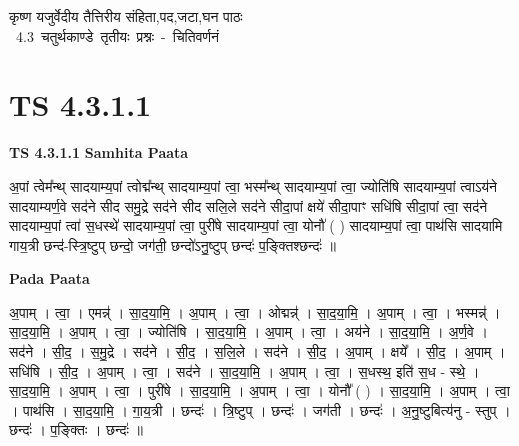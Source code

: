 \documentclass[17pt]{extarticle}
\begin{document}
\begin{titlepage}
    \begin{center}
 
\begin{sanskrit}
    { \Huge
    कृष्ण यजुर्वेदीय तैत्तिरीय संहिता,पद,जटा,घन पाठः 
    }
    \\
    \vspace{2.5cm}
    \mbox{ \Huge
    4.3      चतुर्थकाण्डे तृतीयः प्रश्नः - चितिवर्णनं   }
\end{sanskrit}
\end{center}

\end{titlepage}
\tableofcontents
\pagebreak

\section*{ TS 4.3.1.1 }

\textbf{TS 4.3.1.1 } \newline
\textbf{Samhita Paata} \newline

अ॒पां त्वेम᳚न्थ् सादयाम्य॒पां त्वोद्म᳚न्थ् सादयाम्य॒पां त्वा॒ भस्म᳚न्थ् सादयाम्य॒पां त्वा॒ ज्योति॑षि सादयाम्य॒पां त्वाऽय॑ने सादयाम्यर्ण॒वे सद॑ने सीद समु॒द्रे सद॑ने सीद सलि॒ले सद॑ने सीदा॒पां क्षये॑ सीदा॒पाꣳ सधि॑षि सीदा॒पां त्वा॒ सद॑ने सादयाम्य॒पां त्वा॑ स॒धस्थे॑ सादयाम्य॒पां त्वा॒ पुरी॑षे सादयाम्य॒पां त्वा॒ योनौ॑ ( ) सादयाम्य॒पां त्वा॒ पाथ॑सि सादयामि गाय॒त्री छन्द॑-स्त्रि॒ष्टुप् छन्दो॒ जग॑ती॒ छन्दो॑ऽनु॒ष्टुप् छन्दः॑ प॒ङ्क्तिश्छन्दः॑ ॥ \newline

\textbf{Pada Paata} \newline

अ॒पाम् । त्वा॒ । एमन्न्॑ । सा॒द॒या॒मि॒ । अ॒पाम् । त्वा॒ । ओद्मन्न्॑ । सा॒द॒या॒मि॒ । अ॒पाम् । त्वा॒ । भस्मन्न्॑ । सा॒द॒या॒मि॒ । अ॒पाम् । त्वा॒ । ज्योति॑षि । सा॒द॒या॒मि॒ । अ॒पाम् । त्वा॒ । अय॑ने । सा॒द॒या॒मि॒ । अ॒र्ण॒वे । सद॑ने । सी॒द॒ । स॒मु॒द्रे । सद॑ने । सी॒द॒ । स॒लि॒ले । सद॑ने । सी॒द॒ । अ॒पाम् । क्षये᳚ । सी॒द॒ । अ॒पाम् । सधि॑षि । सी॒द॒ । अ॒पाम् । त्वा॒ । सद॑ने । सा॒द॒या॒मि॒ । अ॒पाम् । त्वा॒ । स॒धस्थ॒ इति॑ स॒ध - स्थे॒ । सा॒द॒या॒मि॒ । अ॒पाम् । त्वा॒ । पुरी॑षे । सा॒द॒या॒मि॒ । अ॒पाम् । त्वा॒ । योनौ᳚ ( ) । सा॒द॒या॒मि॒ । अ॒पाम् । त्वा॒ । पाथ॑सि । सा॒द॒या॒मि॒ । गा॒य॒त्री । छन्दः॑ । त्रि॒ष्टुप् । छन्दः॑ । जग॑ती । छन्दः॑ । अ॒नु॒ष्टुबित्य॑नु - स्तुप् । छन्दः॑ । प॒ङ्क्तिः । छन्दः॑ ॥  \newline
\end{document}
